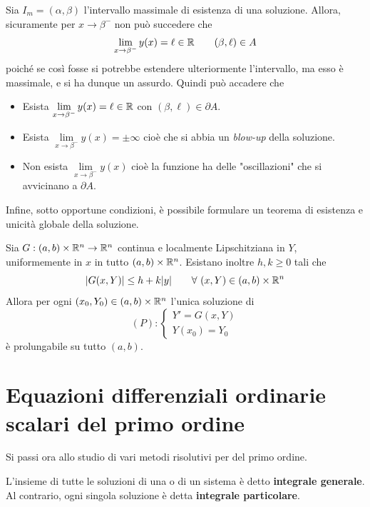 \begin{oss}
    Sia $I_m=(\alpha, \beta)$ l'intervallo massimale di esistenza di una soluzione. Allora, sicuramente per $x \to \beta^-$ non può succedere che 
        \begin{equation}
            \lim_{x \to \beta^-}{y(x)}= \ell \in \mathbb{R} \qquad (\beta, \ell) \in A
        \end{equation}
        poiché se così fosse si potrebbe estendere ulteriormente l'intervallo, ma esso è massimale, e si ha dunque un assurdo.
        Quindi può accadere che
        \begin{itemize}
            \item Esista $\lim\limits_{x \to \beta^-}{y(x)}= \ell \in \mathbb{R}$
            con $(\beta, \ell) \in \partial A$.
            \item Esista $\lim\limits_{x \to \beta^-}{y(x)}= \pm \infty$
            cioè che si abbia un \textit{blow-up} della soluzione.
            \item Non esista $\lim\limits_{x \to \beta^-}{y(x)}$
                cioè la funzione ha delle "oscillazioni" che si avvicinano a $\partial A$.
            \end{itemize}
\end{oss}
Infine, sotto opportune condizioni, è possibile formulare un teorema di esistenza e unicità globale della soluzione.
\begin{theorem} \label{Teo: Esistenza e unicità globale}
    Sia $G: (a, b) \times \mathbb{R}^n \to \mathbb{R}^n$ continua e localmente Lipschitziana in $Y$, uniformemente in $x$ in tutto $(a, b) \times \mathbb{R}^n$. Esistano inoltre $h,k \geq 0$ tali che 
    \begin{equation} \label{Eq: Crescità sublineare}
        \left|G(x, Y)\right| \leq h+ k|y|
    \qquad \forall\ (x, Y) \in (a,b) \times \mathbb{R}^n
    \end{equation}
    Allora per ogni $(x_0, Y_0) \in (a,b) \times \mathbb{R}^n$ l'unica soluzione di 
    \begin{equation}
        (P): \begin{cases}
       Y'=G(x, Y)\\
       Y(x_0)=Y_0
       \end{cases}
    \end{equation}
    è prolungabile su tutto $(a, b)$.
\end{theorem}
\section{Equazioni differenziali ordinarie scalari del primo ordine}
Si passi ora allo studio di vari metodi risolutivi per \odes del primo ordine. 
\begin{definition}
    L'insieme di tutte le soluzioni di una \ode o di un sistema è detto \textbf{integrale generale}. Al contrario, ogni singola soluzione è detta \textbf{integrale particolare}.
\end{definition}

